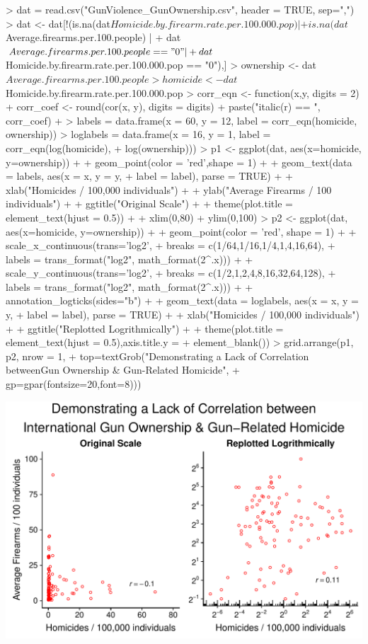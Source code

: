 \documentclass[12pt,letterpaper,final]{article}
\begin{document}
\begin{enumerate}
\begin{Schunk}
\begin{Sinput}
> dat = read.csv("GunViolence_GunOwnership.csv", header = TRUE, sep=",")
> dat <- dat[!(is.na(dat$Homicide.by.firearm.rate.per.100.000.pop) | 
+                is.na(dat$Average.firearms.per.100.people) | 
+                dat$Average.firearms.per.100.people == "0" | 
+                dat$Homicide.by.firearm.rate.per.100.000.pop == "0"),]
> ownership <- dat$Average.firearms.per.100.people
> homicide <- dat$Homicide.by.firearm.rate.per.100.000.pop
> corr_eqn <- function(x,y, digits = 2) {
+   corr_coef <- round(cor(x, y), digits = digits)
+   paste("italic(r) == ", corr_coef)
+ }
> labels = data.frame(x = 60, y = 12, label = corr_eqn(homicide, ownership))
> loglabels = data.frame(x = 16, y = 1, label = corr_eqn(log(homicide),
+                                                        log(ownership)))
> p1 <- ggplot(dat, aes(x=homicide, y=ownership)) + 
+   geom_point(color = 'red',shape = 1) + 
+   geom_text(data = labels, aes(x = x, y = y,
+                         label = label), parse = TRUE) +
+   xlab("Homicides / 100,000 individuals") +
+   ylab("Average Firearms / 100 individuals") +
+   ggtitle("Original Scale") +
+   theme(plot.title = element_text(hjust = 0.5)) +
+   xlim(0,80) + ylim(0,100)
> p2 <- ggplot(dat, aes(x=homicide, y=ownership)) + 
+   geom_point(color = 'red', shape = 1) +
+   scale_x_continuous(trans='log2',
+     breaks = c(1/64,1/16,1/4,1,4,16,64),
+     labels = trans_format("log2", math_format(2^.x))) + 
+   scale_y_continuous(trans='log2',
+     breaks = c(1/2,1,2,4,8,16,32,64,128),
+     labels = trans_format("log2", math_format(2^.x))) + 
+   annotation_logticks(sides="b") +
+   geom_text(data = loglabels, aes(x = x, y = y,
+                         label = label), parse = TRUE) +
+   xlab("Homicides / 100,000 individuals") +
+   ggtitle("Replotted Logrithmically") +
+   theme(plot.title = element_text(hjust = 0.5),axis.title.y = 
+           element_blank())
> grid.arrange(p1, p2, nrow = 1, 
+              top=textGrob("Demonstrating a Lack of Correlation between\nInternational Gun Ownership & Gun-Related Homicide",
+                           gp=gpar(fontsize=20,font=8)))
\end{Sinput}
\end{Schunk}
\includegraphics{hw03_bartschi-003}


\end{enumerate}
\end{document}
